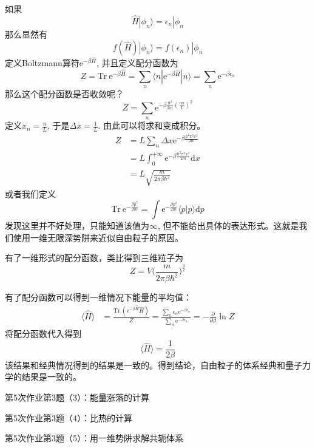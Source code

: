         如果
        \[ \hat{H} | \phi_n \rangle = \epsilon_n |\phi_n \]
        那么显然有
        \[ f(\hat{H})|\phi_n \rangle = f(\epsilon_n)|\phi_n \]
        定义Boltzmann算符$\mathrm{e}^{-\beta\hat{H}}$, 并且定义配分函数为
        \[ Z = \mathrm{Tr}\  \mathrm{e}^{-\beta \hat{H}} = \sum_n \langle n| \mathrm{e}^{-\beta \hat{H}} | n \rangle = \sum_n \mathrm{e}^{-\beta \epsilon_n }\]
        那么这个配分函数是否收敛呢？
        \[ Z = \sum_n \mathrm{e}^{-\beta \frac {\hbar^2}{2m} (\frac {n\pi}L)^2} \]
        定义$x_n = \frac nL$, 于是$\Delta x = \frac 1L$. 由此可以将求和变成积分。
        \begin{equation}\begin{aligned}
            Z &= L \sum_n \Delta x \mathrm{e}^{-\beta \frac {\hbar^2\pi^2 x^2}{2m} }\\
            &= L \int_0^{+\infty} \mathrm{e}^{-\beta \frac {\hbar^2\pi^2 x^2}{2m}} \mathrm{d}x\\
            &= L\sqrt{\frac m{2\pi \beta \hbar^2}}
        \end{aligned}\end{equation}
        或者我们定义
        \[ \mathrm{Tr} \ \mathrm{e}^{-\frac {\beta \hat{p}^2}{2m}} = \int \mathrm{e}^{-\frac {\beta p^2}{2m}} \langle p|p\rangle \mathrm{d}p \]
        发现这里并不好处理，只能知道该值为$\infty$, 但不能给出具体的表达形式。这就是我们使用一维无限深势阱来近似自由粒子的原因。

        有了一维形式的配分函数，类比得到三维粒子为
        \[ Z = V \bigg(\frac m{2\pi \beta \hbar^2}\bigg)^{\frac 32} \]

        有了配分函数可以得到一维情况下能量的平均值：
        \begin{equation}\begin{aligned}
            \langle \hat{H} \rangle &= \frac {\mathrm{Tr} \ (\mathrm{e}^{-\beta \hat{H}} \hat{H})}Z
            = \frac {\sum_n \epsilon_n \mathrm{e}^{-\beta \epsilon_n}}{\sum_n \mathrm{e}^{-\beta \epsilon_n}}
            = -\frac {\partial}{\partial \beta} \ln{Z}
        \end{aligned}\end{equation}
        将配分函数代入得到
        \[ \langle \hat{H} \rangle = \frac 1{2\beta} \]
        该结果和经典情况得到的结果是一致的。得到结论，自由粒子的体系经典和量子力学的结果是一致的。
        \begin{asg}
            第5次作业第3题（3）：能量涨落的计算
        \end{asg}
        \begin{asg}
            第5次作业第3题（4）：比热的计算
        \end{asg}
        \begin{asg}
            第5次作业第3题（5）：用一维势阱求解共轭体系
        \end{asg}

